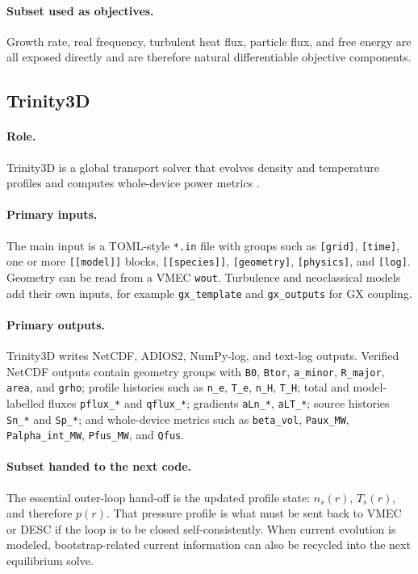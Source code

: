 \documentclass[11pt]{article}
\newcommand{\code}[1]{\texttt{#1}}
\begin{document}
\paragraph{Subset used as objectives.}
Growth rate, real frequency, turbulent heat flux, particle flux, and free
energy are all exposed directly and are therefore natural differentiable
objective components.

\subsection{Trinity3D}

\paragraph{Role.}
Trinity3D is a global transport solver that evolves density and temperature
profiles and computes whole-device power metrics \citep{TrinityDocs,BanonNavarro2023}.

\paragraph{Primary inputs.}
The main input is a TOML-style \code{*.in} file with groups such as
\code{[grid]}, \code{[time]}, one or more \code{[[model]]} blocks,
\code{[[species]]}, \code{[geometry]}, \code{[physics]}, and \code{[log]}.
Geometry can be read from a VMEC \code{wout}. Turbulence and neoclassical
models add their own inputs, for example \code{gx\_template} and
\code{gx\_outputs} for GX coupling.

\paragraph{Primary outputs.}
Trinity3D writes NetCDF, ADIOS2, NumPy-log, and text-log outputs. Verified
NetCDF outputs contain geometry groups with \code{B0}, \code{Btor},
\code{a\_minor}, \code{R\_major}, \code{area}, and \code{grho}; profile
histories such as \code{n\_e}, \code{T\_e}, \code{n\_H}, \code{T\_H}; total
and model-labelled fluxes \code{pflux\_*} and \code{qflux\_*}; gradients
\code{aLn\_*}, \code{aLT\_*}; source histories \code{Sn\_*} and \code{Sp\_*};
and whole-device metrics such as \code{beta\_vol}, \code{Paux\_MW},
\code{Palpha\_int\_MW}, \code{Pfus\_MW}, and \code{Qfus}.

\paragraph{Subset handed to the next code.}
The essential outer-loop hand-off is the updated profile state:
\(n_s(r)\), \(T_s(r)\), and therefore \(p(r)\). That pressure profile is what
must be sent back to VMEC or DESC if the loop is to be closed
self-consistently. When current evolution is modeled, bootstrap-related current
information can also be recycled into the next equilibrium solve.
\end{document}
